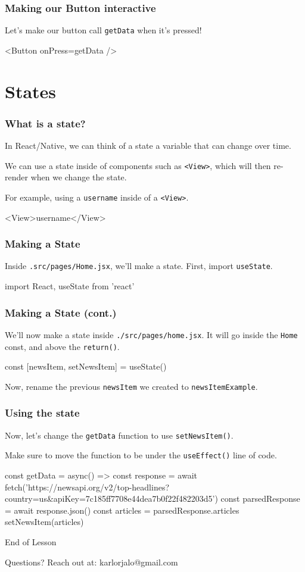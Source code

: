 \documentclass{beamer}
\begin{document}
  \begin{frame}[fragile]
    \frametitle{Making our Button interactive}
    Let's make our button call \verb|getData| when it's pressed!
    \begin{jscodesmall}
<Button onPress={getData} />
    \end{jscodesmall}
  \end{frame}

  \section{States}

  \begin{frame}[fragile]
    \frametitle{What is a state?}
    In React/Native, we can think of a state a variable that can change over time. 
    
    We can use a state inside of components such as \verb|<View>|, which will then re-render when we change the state.

    For example, using a \verb|username| inside of a \verb|<View>|.
    \begin{jscodesmall}
<View>{username}</View>
    \end{jscodesmall}
  \end{frame}

  \begin{frame}[fragile]
    \frametitle{Making a State}
    Inside \verb|.src/pages/Home.jsx|, we'll make a state. First, import \verb|useState|. 

    \begin{jscodesmall}
import React, {useState} from 'react'
    \end{jscodesmall}
  \end{frame}
  \begin{frame}[fragile]
    \frametitle{Making a State (cont.)}
    We'll now make a state inside \verb|./src/pages/home.jsx|.
    It will go inside the \verb|Home| const, and above the \verb|return()|.
    
    \begin{jscodesmall}
const [newsItem, setNewsItem] = useState()
    \end{jscodesmall}

    Now, rename the previous \verb|newsItem| we created to \verb|newsItemExample|.

  \end{frame}

  \begin{frame}[fragile]
    \frametitle{Using the state}
    Now, let's change the \verb|getData| function to use \verb|setNewsItem()|.

    Make sure to move the function to be under the \verb|useEffect()| line of code. 
    
    \begin{jscodesmall}
const getData = async() => {
  const response = await fetch('https://newsapi.org/v2/top-headlines?country=us&apiKey=7c185ff7708e44dea7b0f22f482203d5')
  const parsedResponse = await response.json()
  const articles = parsedResponse.articles
  setNewsItem(articles)
}  
    \end{jscodesmall}
  \end{frame}


  \appendix

  \begin{frame}[standout]
    End of Lesson

    {\small Questions? Reach out at:}
    {\footnotesize karlorjalo@gmail.com}
  \end{frame}
\end{document}
